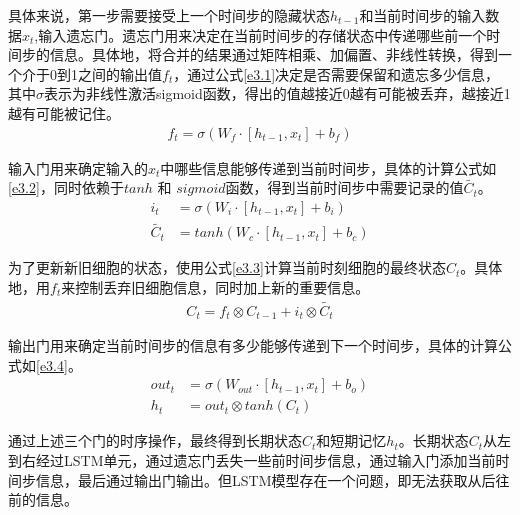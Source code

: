 具体来说，第一步需要接受上一个时间步的隐藏状态$h_{t-1}$和当前时间步的输入数据$x_{t}$,输入遗忘门。遗忘门用来决定在当前时间步的存储状态中传递哪些前一个时间步的信息。具体地，将合并的结果通过矩阵相乘、加偏置、非线性转换，得到一个介于0到1之间的输出值$f_{t}$，通过公式\ref{e3.1}决定是否需要保留和遗忘多少信息，其中$\sigma$表示为非线性激活sigmoid函数，得出的值越接近0越有可能被丢弃，越接近1越有可能被记住。
\begin{equation}\label{e3.1}
  \begin{split}
    f_{t} = \sigma \left(W_{f} \cdot \left[h_{t-1},x_{t}\right] + b_f \right)
  \end{split}
\end{equation}

输入门用来确定输入的$x_{t}$中哪些信息能够传递到当前时间步，具体的计算公式如\ref{e3.2}，同时依赖于$tanh$ 和 $sigmoid$函数，得到当前时间步中需要记录的值$\widetilde{C_t}$。
\begin{equation}\label{e3.2}
  \begin{split}
    i_t &= \sigma \left(W_{i} \cdot \left[h_{t-1},x_{t}\right] + b_i\right)
    \\
    \widetilde{C_t} &= tanh \left(W_{c} \cdot \left[h_{t-1},x_{t}\right] + b_c \right)
  \end{split}
\end{equation}

为了更新新旧细胞的状态，使用公式\ref{e3.3}计算当前时刻细胞的最终状态$C_t$。具体地，用$f_{t}$来控制丢弃旧细胞信息，同时加上新的重要信息。
\begin{equation}\label{e3.3}
  \begin{split}
   C_t = f_t \otimes C_{t-1} + i_t \otimes \widetilde{C_t}
  \end{split}
\end{equation}

输出门用来确定当前时间步的信息有多少能够传递到下一个时间步，具体的计算公式如\ref{e3.4}。
\begin{equation}\label{e3.4}
  \begin{split}
   out_t &= \sigma \left(W_{out} \cdot \left[h_{t-1},x_{t}\right] + b_o \right)
   \\
   h_t &= out_t \otimes tanh \left(C_t\right)
  \end{split}
\end{equation}

通过上述三个门的时序操作，最终得到长期状态$C_t$和短期记忆$h_t$。长期状态$C_t$从左到右经过LSTM单元，通过遗忘门丢失一些前时间步信息，通过输入门添加当前时间步信息，最后通过输出门输出。但LSTM模型存在一个问题，即无法获取从后往前的信息。

